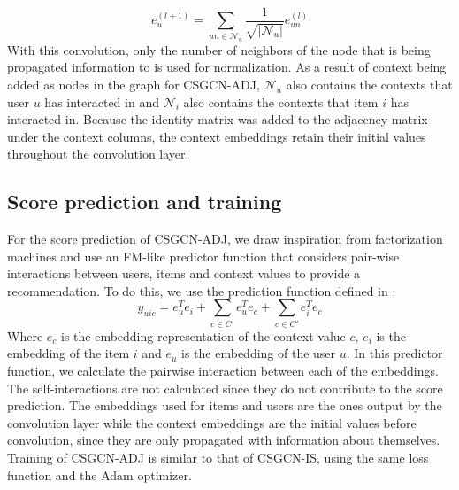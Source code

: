 \begin{equation}\label{eq:csgcn_adj_gc_layer_user}
     e_{u}^{(l+1)}=\sum_{un\in \mathcal{N}_{u}}\frac{1}{ \sqrt{|\mathcal{N}_{u}|}}e_{un}^{(l)}
\end{equation}
With this convolution, only the number of neighbors of the node that is being propagated information to is used for normalization.
As a result of context being added as nodes in the graph for CSGCN-ADJ, $\mathcal{N}_{u}$ also contains the contexts that user $u$ has interacted in and $\mathcal{N}_{i}$ also contains the contexts that item $i$ has interacted in.
Because the identity matrix was added to the adjacency matrix under the context columns, the context embeddings retain their initial values throughout the convolution layer.

\subsection{Score prediction and training}\label{subsec:csgcn_adj_score_pred}
For the score prediction of CSGCN-ADJ, we draw inspiration from factorization machines and use an FM-like predictor function that considers pair-wise interactions between users, items and context values to provide a recommendation.
To do this, we use the prediction function defined in :
\begin{equation}\label{eq:csgcn_adj_scorepred}
    \hat{y}_{uic} = e_u^Te_i + \sum_{c \in C'}e_u^Te_{c} + \sum_{c \in C'}e_i^Te_{c}
\end{equation}
Where $e_{c}$ is the embedding representation of the context value $c$, $e_i$ is the embedding of the item $i$ and $e_u$ is the embedding of the user $u$.
In this predictor function, we calculate the pairwise interaction between each of the embeddings.
The self-interactions are not calculated since they do not contribute to the score prediction.
The embeddings used for items and users are the ones output by the convolution layer while the context embeddings are the initial values before convolution, since they are only propagated with information about themselves.
\\
Training of CSGCN-ADJ is similar to that of CSGCN-IS, using the same loss function and the Adam optimizer.
